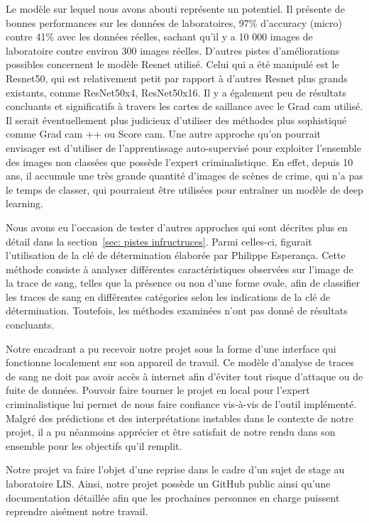 \documentclass[a4paper]{article}
\begin{document}
Le modèle sur lequel nous avons abouti représente un potentiel. Il présente de bonnes performances sur les données de laboratoires, 97\% d'accuracy (micro) contre 41\% avec les données réelles, sachant qu'il y a 10 000 images de laboratoire contre environ 300 images réelles.
D'autres pistes d'améliorations possibles concernent le modèle Resnet utilisé. Celui qui a été manipulé est le Resnet50, qui est relativement petit par rapport à d'autres Resnet plus grands existants, comme ResNet50x4, ResNet50x16. Il y a également peu de résultats concluants et significatifs à travers les cartes de saillance avec le Grad cam utilisé. Il serait éventuellement plus judicieux d'utiliser des méthodes plus sophistiqué comme Grad cam ++ ou Score cam. Une autre approche qu'on pourrait envisager est d'utiliser de l'apprentissage auto-supervisé pour exploiter l'ensemble des images non classées que possède l'expert criminalistique. En effet, depuis 10 ans, il accumule une très grande quantité d'images de scènes de crime, qui n'a pas le temps de classer, qui pourraient être utilisées pour entraîner un modèle de deep learning.

Nous avons eu l'occasion de tester d'autres approches qui sont décrites plus en détail dans la section~\ref{sec: pistes infructruces}. Parmi celles-ci, figurait l'utilisation de la clé de détermination élaborée par Philippe Esperança. Cette méthode consiste à analyser différentes caractéristiques observées sur l'image de la trace de sang, telles que la présence ou non d'une forme ovale, afin de classifier les traces de sang en différentes catégories selon les indications de la clé de détermination. Toutefois, les méthodes examinées n'ont pas donné de résultats concluants.

Notre encadrant a pu recevoir notre projet sous la forme d'une interface qui fonctionne localement sur son appareil de travail. Ce modèle d'analyse de traces de sang ne doit pas avoir accès à internet afin d'éviter tout risque d'attaque ou de fuite de données. Pouvoir faire tourner le projet en local pour l'expert criminalistique lui permet de nous faire confiance vis-à-vis de l'outil implémenté. Malgré des prédictions et des interprétations instables dans le contexte de notre projet, il a pu néanmoins apprécier et être satisfait de notre rendu dans son ensemble pour les objectifs qu'il remplit.

Notre projet va faire l'objet d'une reprise dans le cadre d'un sujet de stage au laboratoire LIS. Ainsi, notre projet possède un GitHub public ainsi qu'une documentation détaillée afin que les prochaines personnes en charge puissent reprendre aisément notre travail.
\end{document}
